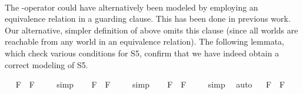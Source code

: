 \begin{isabellebody}
\ %
%
\endisatagproof
{\isafoldproof}%
%
\isadelimproof
%
\endisadelimproof
%
\isamarkuptrue%
%
\begin{isamarkuptext}%
The \isa{{\isasymbox}}-operator could have alternatively been modeled by employing an equivalence relation  in a 
  guarding clause. This has been done in previous work. Our alternative, simpler definition of 
  \isa{{\isasymbox}} above omits
  this clause (since all worlds are reachable from any world in an equivalence relation). The 
  following lemmata, which check various conditions for S5, confirm that we have indeed 
  obtain a correct modeling of S5.%
\end{isamarkuptext}\isamarkuptrue%
\ \isamarkupfalse%
\ {\isachardoublequoteopen}{\isacharbrackleft}\isactrlbold {\isasymbox}{\isasymphi}\isactrlsup F\ \isactrlbold {\isasymrightarrow}\ {\isasymphi}\isactrlsup F{\isacharbrackright}\ {\isacharequal}\ {\isasymtop}{\isachardoublequoteclose}%
\isadelimproof
\ %
\endisadelimproof
%
\isatagproof
{}\isamarkupfalse%
\ simp\ \isamarkupfalse%
%
\endisatagproof
{\isafoldproof}%
%
\isadelimproof
%
\endisadelimproof
\isanewline
\ \isamarkupfalse%
\ {\isachardoublequoteopen}{\isacharbrackleft}{\isasymphi}\isactrlsup F\ \isactrlbold {\isasymrightarrow}\ \isactrlbold {\isasymbox}\isactrlbold {\isasymdiamond}{\isasymphi}\isactrlsup F{\isacharbrackright}\ {\isacharequal}\ {\isasymtop}{\isachardoublequoteclose}%
\isadelimproof
\ %
\endisadelimproof
%
\isatagproof
{}\isamarkupfalse%
\ simp\ \isamarkupfalse%
%
\endisatagproof
{\isafoldproof}%
%
\isadelimproof
%
\endisadelimproof
\isanewline
\ \isamarkupfalse%
\ {\isachardoublequoteopen}{\isacharbrackleft}\isactrlbold {\isasymbox}{\isasymphi}\isactrlsup F\ \isactrlbold {\isasymrightarrow}\ \isactrlbold {\isasymdiamond}{\isasymphi}\isactrlsup F{\isacharbrackright}\ {\isacharequal}\ {\isasymtop}{\isachardoublequoteclose}%
\isadelimproof
\ %
\endisadelimproof
%
\isatagproof
{}\isamarkupfalse%
\ simp\ \isamarkupfalse%
\ auto%
\endisatagproof
{\isafoldproof}%
%
\isadelimproof
%
\endisadelimproof
\isanewline
\ \isamarkupfalse%
\ {\isachardoublequoteopen}{\isacharbrackleft}\isactrlbold {\isasymbox}{\isasymphi}\isactrlsup F\ \isactrlbold {\isasymrightarrow}\ \isactrlbold {\isasymbox}\isactrlbold {\isasymbox}{\isasymphi}\isactrlsup F{\isacharbrackright}\ {\isacharequal}\ {\isasymtop}{\isachardoublequoteclose}%

\end{isabellebody}
